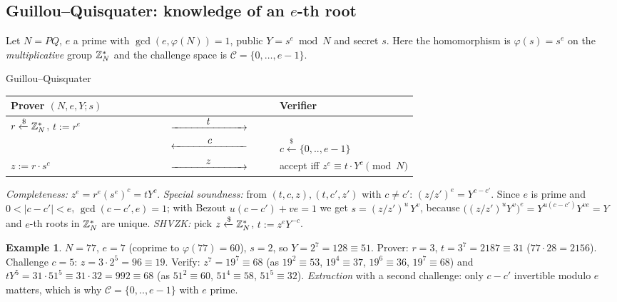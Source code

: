 \documentclass[11pt,a4paper]{report}
\makeatletter
\theoremstyle{plain}
\theoremstyle{definition}
\newtheorem{example}[theorem]{Example}
\theoremstyle{remark}
\newcommand{\getsr}{\xleftarrow{\$}}
\newcommand{\ra}[1]{\xrightarrow{\makebox[2.5cm]{$#1$}}}
\newcommand{\la}[1]{\xleftarrow{\makebox[2.5cm]{$#1$}}}
\newcommand{\Zs}[1]{\ZZ_{#1}^{*}}
\newenvironment{flow}[2]{%
  \par\smallskip\noindent
  \begin{tabular}{@{}L{0.34\linewidth} c L{0.34\linewidth}@{}}
  \textbf{#1} & & \textbf{#2}\\ \hline}{\end{tabular}\par\smallskip}
\makeatother
\begin{document}
\subsection{Guillou--Quisquater: knowledge of an \texorpdfstring{$e$}{e}-th root}
Let $N=PQ$, $e$ a prime with $\gcd(e,\varphi(N))=1$, public $Y=s^e\bmod N$ and secret $s$. Here the homomorphism is $\varphi(s)=s^e$ on the \emph{multiplicative} group $\Zs N$ and the challenge space is $\mathcal C=\{0,\dots,e-1\}$.
\begin{protocol}[label=pr:gq]{Guillou--Quisquater}
\begin{flow}{Prover $(N,e,Y;s)$}{Verifier}
$r\getsr\Zs N$, $t:=r^e$ & $\ra{t}$ & \\
 & $\la{c}$ & $c\getsr\{0,..,e-1\}$\\
$z:=r\cdot s^c$ & $\ra{z}$ & accept iff $z^e\equiv t\cdot Y^c\pmod N$
\end{flow}
\end{protocol}
\emph{Completeness:} $z^e=r^e(s^e)^c=tY^c$. \emph{Special soundness:} from $(t,c,z),(t,c',z')$ with $c\ne c'$: $(z/z')^e=Y^{c-c'}$. Since $e$ is prime and $0<|c-c'|<e$, $\gcd(c-c',e)=1$; with Bezout $u(c-c')+ve=1$ we get $s=(z/z')^u\,Y^{v}$, because $\big((z/z')^uY^v\big)^e=Y^{u(c-c')}Y^{ve}=Y$ and $e$-th roots in $\Zs N$ are unique. \emph{SHVZK:} pick $z\getsr\Zs N$, $t:=z^eY^{-c}$.
\begin{example}
$N=77$, $e=7$ (coprime to $\varphi(77)=60$), $s=2$, so $Y=2^7=128\equiv51$. Prover: $r=3$, $t=3^7=2187\equiv31$ ($77\cdot28=2156$). Challenge $c=5$: $z=3\cdot2^5=96\equiv19$. Verify: $z^7=19^7\equiv68$ (as $19^2\equiv53$, $19^4\equiv37$, $19^6\equiv36$, $19^7\equiv68$) and $tY^5=31\cdot51^5\equiv31\cdot32=992\equiv68$ (as $51^2\equiv60$, $51^4\equiv58$, $51^5\equiv32$). \checkmark \emph{Extraction} with a second challenge: only $c-c'$ invertible modulo $e$ matters, which is why $\mathcal C=\{0,..,e-1\}$ with $e$ prime.
\end{example}
\end{document}
